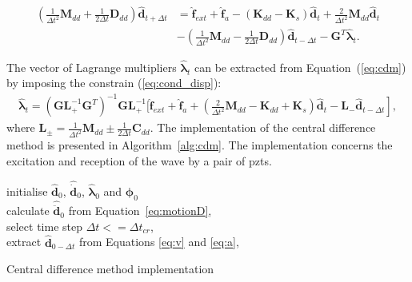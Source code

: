 \begin{equation}
	\begin{split}
		\left(\frac{1}{\Delta t^2}\textbf{M}_{dd}+\frac{1}{2\Delta t}\textbf{D}_{dd} \right)\widehat{\textbf{d}}_{t+\Delta t} & = \widehat{\textbf{f}}_{ext} + \widehat{\textbf{f}}_{a} - \left( \textbf{K}_{dd}-\textbf{K}_s\right)\widehat{\textbf{d}}_t
		+ \frac{2}{\Delta t^2}\textbf{M}_{dd}\widehat{\textbf{d}}_t\\
		&-\left(\frac{1}{\Delta t^2}\textbf{M}_{dd}-\frac{1}{2\Delta t}\textbf{D}_{dd}\right)\widehat{\textbf{d}}_{t-\Delta t}-\textbf{G}^T\widehat{\boldsymbol{\lambda}}_t.
	\end{split}
	\label{eq:cdm}
\end{equation}

The vector of Lagrange multipliers \(\widehat{\boldsymbol{\lambda}}_t\) can be extracted from Equation~(\ref{eq:cdm}) by imposing the constrain (\ref{eq:cond_disp}): 
\begin{eqnarray}
	\widehat{\boldsymbol{\lambda}}_t = {\left(\textbf{G}\textbf{L}_+^{-1}\textbf{G}^T \right)}^{-1}\textbf{G}\textbf{L}_+^{-1} \Bigg[ \widehat{\textbf{f}}_{ext} + \widehat{\textbf{f}}_{a} + \left.\left(\frac{2}{\Delta t^2}\textbf{M}_{dd}-\textbf{K}_{dd}+\textbf{K}_s\right)\widehat{\textbf{d}}_t -\textbf{L}_-\widehat{\textbf{d}}_{t-\Delta t} \right],
	\label{eq:lambda}
\end{eqnarray}
where \(\textbf{L}_{\pm}=\frac{1}{\Delta t^2}\textbf{M}_{dd}\pm\frac{1}{2\Delta t}\textbf{C}_{dd}\).
The implementation of the central difference method is presented in Algorithm~\ref{alg:cdm}.
The implementation concerns the excitation and reception of the wave by a pair of \acp{pzt}.

\begin{algorithm}[H]
	\SetAlgoLined
	initialise  \(\widehat{\textbf{d}}_0\), \(\widehat{\dot{\textbf{d}}}_0\), \(\widehat{\boldsymbol{\lambda}}_0\) and \(\boldsymbol{\phi}_{0}\)\\
	calculate \(\widehat{\ddot{\textbf{d}}}_0\) from Equation~\ref{eq:motionD},\\
	select time step \(\Delta t<=\Delta t_{cr}\),\\
	extract \(\widehat{\textbf{d}}_{0-\Delta t}\) from Equations \ref{eq:v} and \ref{eq:a},\\
	\caption{Central difference method implementation}
	\label{alg:cdm}
\end{algorithm}

